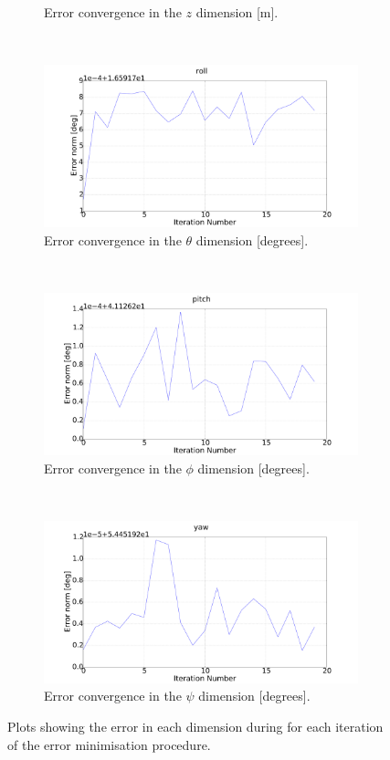 \begin{figure}
\begin{subfigure}{0.45\textwidth}
    \caption{Error convergence in the $z$ dimension [m].}
\label{fig:err-convergence-z}
  \end{subfigure}
~
  \begin{subfigure}{0.45\textwidth}
    \includegraphics[width=\textwidth]{figures/chapter3/err_roll}
    \caption{Error convergence in the $\theta$ dimension [degrees].}
\label{fig:err-convergence-roll}
  \end{subfigure}
~
  \begin{subfigure}{0.45\textwidth}
    \includegraphics[width=\textwidth]{figures/chapter3/err_pitch}
    \caption{Error convergence in the $\phi$ dimension [degrees].}
\label{fig:err-convergence-pitch}
  \end{subfigure}
~
  \begin{subfigure}{0.45\textwidth}
    \includegraphics[width=\textwidth]{figures/chapter3/err_yaw}
    \caption{Error convergence in the $\psi$ dimension [degrees].}
\label{fig:err-convergence-psi}
  \end{subfigure}
  \caption{Plots showing the error in each dimension during for each iteration of the error minimisation procedure.}
  \label{fig:err-convergence}
\end{figure}

